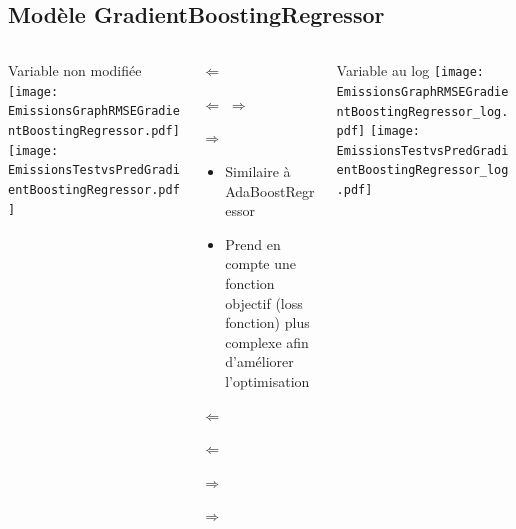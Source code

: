 \documentclass[8pt,aspectratio=169,hyperref={unicode=true}]{beamer}
\begin{document}
\subsection{Modèle GradientBoostingRegressor}
\begin{frame}{\insertsubsection}
  \begin{columns}[t]
    \begin{column}{.33\textwidth}
      \centering Variable non modifiée
      \texttt{[image: EmissionsGraphRMSEGradientBoostingRegressor.pdf]}
      \texttt{[image: EmissionsTestvsPredGradientBoostingRegressor.pdf]}
    \end{column}
    \begin{column}{.33\textwidth}
      $\Longleftarrow$

      {\footnotesize
          }

      $\Longleftarrow$ \hfill $\Longrightarrow$

      \raggedleft
      {\footnotesize
        }

      $\Longrightarrow$

      \raggedright
      \begin{itemize}
        \item Similaire à AdaBoostRegressor
        \item Prend en compte une fonction objectif (loss fonction) plus complexe afin
              d'améliorer l'optimisation
      \end{itemize}

      $\Longleftarrow$
      {\scriptsize \centering
          }

      $\Longleftarrow$

      \raggedleft
      $\Longrightarrow$

      {\scriptsize \centering
          
        }
      \raggedleft
      $\Longrightarrow$
    \end{column}
    \begin{column}{.33\textwidth}
      \centering Variable au log
      \texttt{[image: EmissionsGraphRMSEGradientBoostingRegressor\_log.pdf]}
      \texttt{[image: EmissionsTestvsPredGradientBoostingRegressor\_log.pdf]}
    \end{column}
  \end{columns}
\end{frame}
\end{document}
